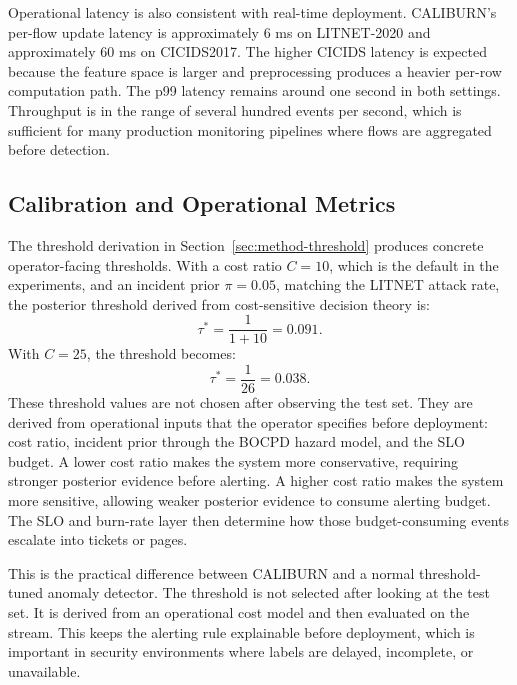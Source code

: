 \documentclass[preprint,12pt,authoryear]{elsarticle}
\newcommand{\caliburn}{CALIBURN}
\begin{document}
Operational latency is also consistent with real-time deployment. \caliburn{}'s per-flow update latency is approximately 6 ms on LITNET-2020 and approximately 60 ms on CICIDS2017. The higher CICIDS latency is expected because the feature space is larger and preprocessing produces a heavier per-row computation path. The p99 latency remains around one second in both settings. Throughput is in the range of several hundred events per second, which is sufficient for many production monitoring pipelines where flows are aggregated before detection.

\subsection{Calibration and Operational Metrics}
\label{sec:results-calibration}

The threshold derivation in Section~\ref{sec:method-threshold} produces concrete operator-facing thresholds. With a cost ratio $C = 10$, which is the default in the experiments, and an incident prior $\pi = 0.05$, matching the LITNET attack rate, the posterior threshold derived from cost-sensitive decision theory is:
\begin{equation}
    \tau^{*} = \frac{1}{1 + 10} = 0.091.
\end{equation}
With $C = 25$, the threshold becomes:
\begin{equation}
    \tau^{*} = \frac{1}{26} = 0.038.
\end{equation}
These threshold values are not chosen after observing the test set. They are derived from operational inputs that the operator specifies before deployment: cost ratio, incident prior through the BOCPD hazard model, and the SLO budget. A lower cost ratio makes the system more conservative, requiring stronger posterior evidence before alerting. A higher cost ratio makes the system more sensitive, allowing weaker posterior evidence to consume alerting budget. The SLO and burn-rate layer then determine how those budget-consuming events escalate into tickets or pages.

This is the practical difference between \caliburn{} and a normal threshold-tuned anomaly detector. The threshold is not selected after looking at the test set. It is derived from an operational cost model and then evaluated on the stream. This keeps the alerting rule explainable before deployment, which is important in security environments where labels are delayed, incomplete, or unavailable.

\end{document}
